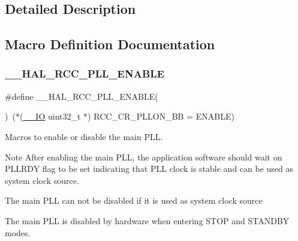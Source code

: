 \subsection{Detailed Description}


\subsection{Macro Definition Documentation}
\mbox{\label{group___r_c_c___p_l_l___configuration_gaaf196a2df41b0bcbc32745c2b218e696}} 
\subsubsection{\texorpdfstring{\+\_\+\+\_\+\+H\+A\+L\+\_\+\+R\+C\+C\+\_\+\+P\+L\+L\+\_\+\+E\+N\+A\+B\+LE}{\_\_HAL\_RCC\_PLL\_ENABLE}}
{\footnotesize\ttfamily \#define \+\_\+\+\_\+\+H\+A\+L\+\_\+\+R\+C\+C\+\_\+\+P\+L\+L\+\_\+\+E\+N\+A\+B\+LE(\begin{DoxyParamCaption}{ }\end{DoxyParamCaption})~($\ast$(\hyperlink{core__sc300_8h_aec43007d9998a0a0e01faede4133d6be}{\+\_\+\+\_\+\+IO} uint32\+\_\+t $\ast$) R\+C\+C\+\_\+\+C\+R\+\_\+\+P\+L\+L\+O\+N\+\_\+\+BB = E\+N\+A\+B\+LE)}



Macros to enable or disable the main P\+LL. 

\begin{DoxyNote}{Note}
After enabling the main P\+LL, the application software should wait on P\+L\+L\+R\+DY flag to be set indicating that P\+LL clock is stable and can be used as system clock source. 

The main P\+LL can not be disabled if it is used as system clock source 

The main P\+LL is disabled by hardware when entering S\+T\+OP and S\+T\+A\+N\+D\+BY modes. 
\end{DoxyNote}
\mbox{\label{group___r_c_c___p_l_l___configuration_gabca62f581e6c2553cca7ef0d7a2a4b7f}} 
